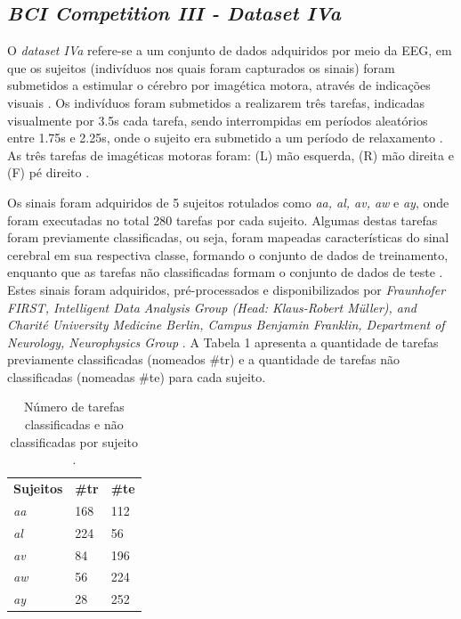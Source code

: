 \subsection{\textit{BCI Competition III - Dataset IVa}}
O \textit{dataset IVa} refere-se a um conjunto de dados adquiridos por meio da EEG, em que os sujeitos (indivíduos nos quais foram capturados os sinais) foram submetidos a estimular o cérebro por imagética motora, através de indicações visuais \cite{BCICompetition}. Os indivíduos foram submetidos a realizarem três tarefas, indicadas visualmente por 3.5s cada tarefa, sendo interrompidas em períodos aleatórios entre 1.75s e 2.25s, onde o sujeito era submetido a um período de relaxamento \cite{BCICompetition}. As três tarefas de imagéticas motoras foram: (L) mão esquerda, (R) mão direita e (F) pé direito \cite{BCICompetition}.

Os sinais foram adquiridos de 5 sujeitos rotulados como \textit{aa, al, av, aw} e \textit{ay}, onde foram executadas no total 280 tarefas por cada sujeito. Algumas destas tarefas foram previamente classificadas, ou seja, foram mapeadas características do sinal cerebral em sua respectiva classe, formando o conjunto de dados de treinamento, enquanto que as tarefas não classificadas formam o conjunto de dados de teste \cite{siteBCI}. Estes sinais foram adquiridos, pré-processados e disponibilizados por \textit{Fraunhofer FIRST, Intelligent Data Analysis Group (Head: Klaus-Robert Müller), and Charité University Medicine Berlin, Campus Benjamin Franklin, Department of Neurology, Neurophysics Group} \cite{BCICompetition}. A Tabela 1 apresenta a quantidade de tarefas previamente classificadas (nomeados \#tr) e a quantidade de tarefas não classificadas (nomeadas \#te) para cada sujeito.

\begin{table}[h!]
	\centering
	\caption{Número de tarefas classificadas e não classificadas por sujeito \cite{BCICompetition}.}
	\label{my-label}
	\begin{tabular}{lll}
		\textbf{Sujeitos} & \textbf{\#tr} & \textbf{\#te} \\
		\textit{aa} & 168 & 112 \\
		\textit{al} & 224 & 56 \\
		\textit{av} & 84 & 196 \\
		\textit{aw} & 56 & 224 \\
		\textit{ay} & 28 & 252
	\end{tabular}
\end{table}

